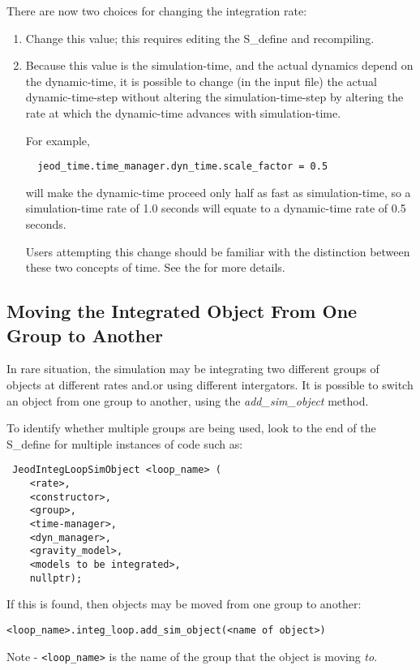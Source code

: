 There are now two choices for changing the integration rate:
\begin{enumerate}
 \item Change this value; this requires editing the S\_define and recompiling.
 \item Because this value is the simulation-time, and the actual dynamics
 depend on the dynamic-time, it is possible to change (in the input file) the
 actual dynamic-time-step without altering the simulation-time-step by
 altering the rate at which the dynamic-time advances with simulation-time.

 For example,
 \begin{verbatim}
  jeod_time.time_manager.dyn_time.scale_factor = 0.5
 \end{verbatim}
 will make the dynamic-time proceed only half as fast as simulation-time, so a
 simulation-time rate of 1.0 seconds will equate to a dynamic-time rate of 0.5
 seconds.

 Users attempting this change should be familiar with the distinction between
 these two concepts of time. See the  for more details.


\end{enumerate}

\subsection{Moving the Integrated Object From One Group to Another}
In rare situation, the simulation may be integrating two different groups of
objects at different rates and.or using different intergators.  It is possible
to switch an object from one group to another, using the
\textit{add\_sim\_object} method.

To identify whether multiple groups are being used, look to the end of the
S\_define for multiple instances of code such as:
\begin{verbatim}
 JeodIntegLoopSimObject <loop_name> (
    <rate>,
    <constructor>,
    <group>,
    <time-manager>,
    <dyn_manager>,
    <gravity_model>,
    <models to be integrated>,
    nullptr);
\end{verbatim}

If this is found, then objects may be moved from one group to another:
\begin{verbatim}
<loop_name>.integ_loop.add_sim_object(<name of object>)
\end{verbatim}
Note - \verb+<loop_name>+ is the name of the group that the object is moving
\textit{to}.


